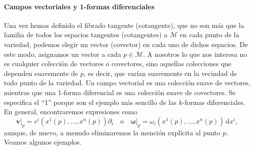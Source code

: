 \paragraph{Campos vectoriales y 1-formas diferenciales} Una vez hemos definido el fibrado tangente (cotangente), que no son más que la familia de todos los espacios tangentes (cotangentes) a \(\mathcal{M}\) en cada punto de la variedad, podemos elegir un vector (covector) en cada uno de dichos espacios. De este modo, asignamos un vector a cada \(p\in\mathcal{M}\). A nosotros lo que nos interesa no es cualquier colección de vectores o covectores, sino aquellas colecciones que dependen suavemente de \(p\), es decir, que varían suavemente en la vecindad de todo punto de la variedad. Un campo vectorial es una colección suave de vectores, mientras que una 1-forma diferencial es una colección suave de covectores. Se especifica el ``1'' porque son el ejemplo más sencillo de las \(k\)-formas diferenciales. En general, encontraremos expresiones como 
\begin{equation}
    \mathbf{v}\big|_p = v^i\left(x^1(p),...,x^n(p)\right) \partial_i\quad\text{o}\quad\boldsymbol{\omega}\big|_p = \omega_i\left(x^1(p),...,x^n(p)\right)\, \mathrm{d}x^i,
\end{equation}
aunque, de nuevo, a menudo eliminaremos la mención explícita al punto \(p\). Veamos algunos ejemplos.

